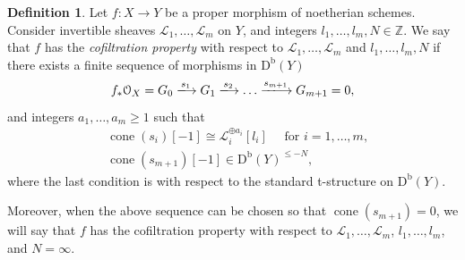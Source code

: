 \documentclass[11pt, reqno]{amsart}
\numberwithin{equation}{section}
\theoremstyle{plain}
\theoremstyle{remark}
\theoremstyle{definition}
\newtheorem{definition}[theorem]{Definition}
\theoremstyle{italicsname}
\newcommand{\Db}{\mathrm{D^b}}
\DeclareMathOperator{\cone}{cone}
\newcommand{\cO}{\mathcal{O}}
\newcommand{\cL}{\mathcal{L}}
\def\ZZ{\ensuremath{\mathbb{Z}}}
\begin{document}
\begin{definition}\label{def:CofiltrationProperty}
Let $f\colon X\to Y$ be a proper morphism of noetherian schemes.
Consider invertible sheaves $\cL_1,\dots,\cL_m$ on $Y$, and integers $l_1,\dots,l_m,N\in\ZZ$.
We say that $f$ has the \emph{cofiltration property} with respect to $\cL_1,\dots,\cL_m$ and $l_1,\dots,l_m,N$ if there exists a finite sequence of morphisms in $\Db(Y)$
\[
f_*\cO_X=G_0 \xlongrightarrow{s_1} G_1 \xlongrightarrow{s_2}\dots\xlongrightarrow{s_{m+1}} G_{m+1}=0,
\]
and integers $a_1, \dots, a_m \geq 1$ such that
\begin{equation*}
\begin{split}
&\cone(s_i)[-1]\cong\cL^{\oplus a_i}_i[l_i] \quad \text{ for } i=1,\dots,m,\\
&\cone(s_{m+1})[-1]\in \Db(Y)^{\leqslant -N}, 
\end{split}
\end{equation*}
where the last condition is with respect to the standard t-structure on $\Db(Y)$.

Moreover, when the above sequence can be chosen so that $\cone(s_{m+1}) = 0$, we will say that $f$ has the cofiltration property with respect to $\cL_1, \dots, \cL_m$, $l_1, \dots, l_m$, and $N = \infty$. 
\end{definition}
\end{document}
